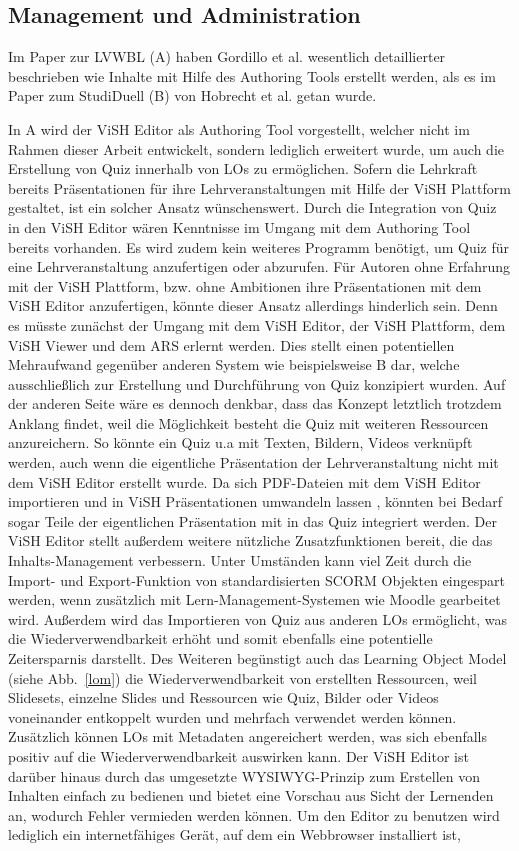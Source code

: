 \documentclass[conference]{IEEEtran}
\begin{document}
\subsection{Management und Administration}
Im Paper zur LVWBL (A) haben Gordillo et al. wesentlich detaillierter beschrieben wie Inhalte mit Hilfe des Authoring Tools erstellt werden, als es im Paper zum StudiDuell (B) von Hobrecht et al. getan wurde. 

In A wird der ViSH Editor als Authoring Tool vorgestellt, welcher nicht im Rahmen dieser Arbeit entwickelt, sondern lediglich erweitert wurde, um auch die Erstellung von Quiz innerhalb von LOs zu ermöglichen. Sofern die Lehrkraft bereits Präsentationen für ihre Lehrveranstaltungen mit Hilfe der ViSH Plattform gestaltet, ist ein solcher Ansatz wünschenswert. Durch die Integration von Quiz in den ViSH Editor wären Kenntnisse im Umgang mit dem Authoring Tool bereits vorhanden. Es wird zudem kein weiteres Programm benötigt, um Quiz für eine Lehrveranstaltung anzufertigen oder abzurufen. Für Autoren ohne Erfahrung mit der ViSH Plattform, bzw. ohne Ambitionen ihre Präsentationen mit dem ViSH Editor anzufertigen, könnte dieser Ansatz allerdings hinderlich sein. Denn es müsste zunächst der Umgang mit dem ViSH Editor, der ViSH Plattform, dem ViSH Viewer und dem ARS erlernt werden. Dies stellt einen potentiellen Mehraufwand gegenüber anderen System wie beispielsweise B dar, welche ausschließlich zur Erstellung und Durchführung von Quiz konzipiert wurden. Auf der anderen Seite wäre es dennoch denkbar, dass das Konzept letztlich trotzdem Anklang findet, weil die Möglichkeit besteht die Quiz mit weiteren Ressourcen anzureichern. So könnte ein Quiz u.a mit Texten, Bildern, Videos verknüpft werden, auch wenn die eigentliche Präsentation der Lehrveranstaltung nicht mit dem ViSH Editor erstellt wurde. Da sich PDF-Dateien mit dem ViSH Editor importieren und in ViSH Präsentationen umwandeln lassen \cite[S. 4]{Gordillo2015}, könnten bei Bedarf sogar Teile der eigentlichen Präsentation mit in das Quiz integriert werden. Der ViSH Editor stellt außerdem weitere nützliche Zusatzfunktionen bereit, die das Inhalts-Management verbessern. Unter Umständen kann viel Zeit durch die Import- und Export-Funktion von standardisierten SCORM Objekten eingespart werden, wenn zusätzlich mit Lern-Management-Systemen wie Moodle gearbeitet wird. Außerdem wird das Importieren von Quiz aus anderen LOs ermöglicht, was die Wiederverwendbarkeit erhöht und somit ebenfalls eine potentielle Zeitersparnis darstellt. Des Weiteren begünstigt auch das Learning Object Model (siehe Abb.~\ref{lom}) die Wiederverwendbarkeit von erstellten Ressourcen, weil Slidesets, einzelne Slides und Ressourcen wie Quiz, Bilder oder Videos voneinander entkoppelt wurden und mehrfach verwendet werden können. Zusätzlich können LOs mit Metadaten angereichert werden, was sich ebenfalls positiv auf die Wiederverwendbarkeit auswirken kann. Der ViSH Editor ist darüber hinaus durch das umgesetzte WYSIWYG-Prinzip zum Erstellen von Inhalten einfach zu bedienen und bietet eine Vorschau aus Sicht der Lernenden an, wodurch Fehler vermieden werden können. Um den Editor zu benutzen wird lediglich ein internetfähiges Gerät, auf dem ein Webbrowser installiert ist, 
\end{document}
